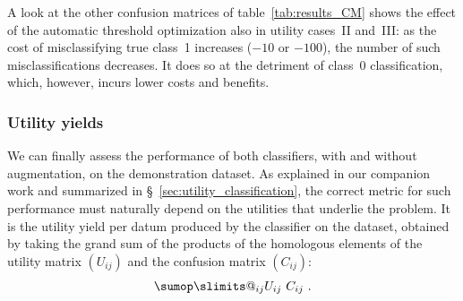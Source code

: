 \documentclass[\ifafour a4paper,12pt,\else a5paper,10pt,\fi%
onecolumn,oneside,article,%
british%
]{memoir}
\makeatletter
\theoremstyle{remark}
\theoremstyle{innote}
\def\sum{\DOTSI\sumop\slimits@}
\renewcommand*{\|}[1][]{\nonscript\:#1\vert\nonscript\:\mathopen{}}
\newcommand*{\sect}{\S}%
\makeatother
\begin{document}
\medskip

A look at the other confusion matrices of table~\ref{tab:results_CM} shows the effect of the automatic threshold optimization also in utility cases~II and~III: as the cost of misclassifying true class~1 increases ($-10$ or $-100$), the number of such misclassifications decreases. It does so at the detriment of class~0 classification, which, however, incurs lower costs and benefits.

\subsubsection{Utility yields}

We can finally assess the performance of both classifiers, with and without augmentation, on the demonstration dataset. As explained in our companion work \autocites{dyrlandetal2022} and summarized in \sect~\ref{sec:utility_classification}, the correct metric for such performance must naturally depend on the utilities that underlie the problem. It is the utility yield per datum produced by the classifier on the dataset, obtained by taking the grand sum of the products of the homologous elements of the utility matrix $(U_{ij})$ and the confusion matrix $(C_{ij})$:
\begin{equation}
  \label{eq:performance_metric}
  \sum_{ij} U_{ij}\ C_{ij} \ .
\end{equation}





\end{document}
